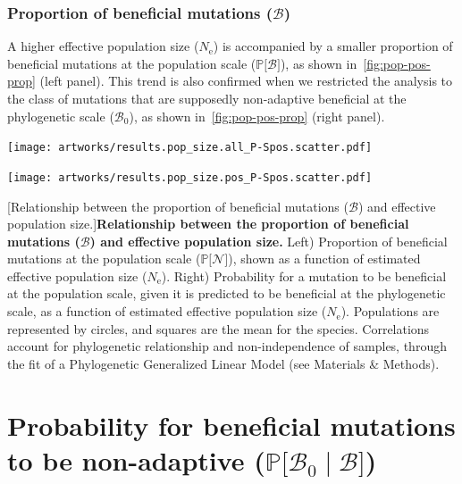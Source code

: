 \documentclass{article}
\newcommand{\Ne}{N_{\text{e}}}
\newcommand{\proba}{\mathbb{P}}
\newcommand{\SphyBen}{\mathcal{B}_0}
\newcommand{\given}{\mid}
\newcommand{\SpopNeu}{\mathcal{N}}
\newcommand{\SpopBen}{\mathcal{B}}
\begin{document}
    \subsubsection{Proportion of beneficial mutations (\texorpdfstring{$\SpopBen$}{B})}\label{subsec:proportion-beneficial-mutations}
    A higher effective population size ($\Ne$) is accompanied by a smaller proportion of beneficial mutations at the population scale ($\proba{[} \SpopBen {]}$), as shown in~\ref{fig:pop-pos-prop} (left panel).
    This trend is also confirmed when we restricted the analysis to the class of mutations that are supposedly non-adaptive beneficial at the phylogenetic scale ($\SphyBen$), as shown in~\ref{fig:pop-pos-prop} (right panel).


    \begin{center}
        \begin{minipage}{0.49\linewidth}
            \texttt{[image: artworks/results.pop\_size.all\_P-Spos.scatter.pdf]}
        \end{minipage}
        \begin{minipage}{0.49\linewidth}
            \texttt{[image: artworks/results.pop\_size.pos\_P-Spos.scatter.pdf]}
        \end{minipage}
        [Relationship between the proportion of beneficial mutations ($\SpopBen$) and effective population size.]{\textbf{Relationship between the proportion of beneficial mutations ($\bm{\SpopBen}$) and effective population size.}
        Left) Proportion of beneficial mutations at the population scale ($\proba{[} \SpopNeu{]}$), shown as a function of estimated effective population size ($\Ne$). Right) Probability for a mutation to be beneficial at the population scale, given it is predicted to be beneficial at the phylogenetic scale, as a function of estimated effective population size ($\Ne$). Populations are represented by circles, and squares are the mean for the species. Correlations account for phylogenetic relationship and non-independence of samples, through the fit of a Phylogenetic Generalized Linear Model (see Materials \& Methods).\label{fig:pop-pos-prop}}
    \end{center}


    \newpage

    \section{Probability for beneficial mutations to be non-adaptive (\texorpdfstring{$\proba{[}\SphyBen\given \SpopBen {]}$}{P[B₀|B]})}
\end{document}
